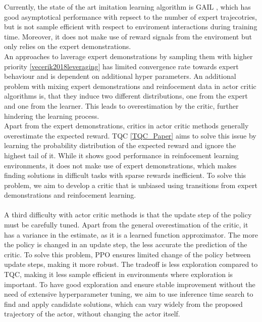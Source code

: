 Currently, the state of the art imitation learning algorithm is GAIL \cite{ho2016generative}, which has good asymptotical performance with repsect to the number of expert trajecotries, but is not sample efficient 
with respect to enviroment interactions during training time. Moreover, it does not make use of reward signals from the enviroment but only relies on the expert demonstrations.\\ 
An approaches to laverage expert demonstrations by sampling them with higher priority \ref{vecerik2018leveraging} has limited convergence rate towards expert behaviour and is dependent on additional hyper parameters. 
An additional problem with mixing expert demonstrations and reinfocement data in actor critic algorithms is, that they induce two different distributions, one from the expert and one from 
the learner. This leads to overestimation by the critic, further hindering the learning process. \\
Apart from the expert demonstrations, critics in actor critic methods generally overestimate the expected reward. TQC \ref{TQC_Paper} aims to solve this issue by learning the 
probability distribution of the expected reward and ignore the highest tail of it. While it shows good performance in reinfocement learning environments, it does not make use of expert demonstrations, 
which makes finding solutions in difficult tasks with sparse rewards inefficient. To solve this problem, we aim to develop a critic that is unbiased using transitions from expert demonstrations 
and reinfocement learning.\\\\
A third difficulty with actor critic methods is that the update step of the policy must be carefully tuned. Apart from the general overestimation of the critic, it has a variance in the estimate, 
as it is a learned function approximator. The more the policy is changed in an update step, the less accurate the prediction of the critic. To solve this problem, PPO ensures limited change of the policy 
between update steps, making it more robust. The tradeoff is less exploration compared to TQC, making it less sample efficient in environments where exploration is important. To have good exploration 
and ensure stable improvement without the need of extensive hyperparameter tuning, we aim to use inference time search to find and apply candidate solutions, which can vary widely from the 
proposed trajectory of the actor, without changing the actor itself. \\

